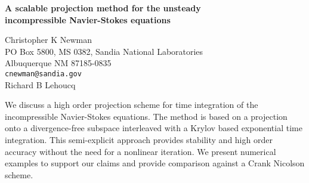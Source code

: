 \documentclass{report}
\begin{document}

\begin{center}
{\large
{\bf A scalable projection method for the unsteady \\
	incompressible Navier-Stokes equations}}

	Christopher K Newman \\
	PO Box 5800, MS 0382, Sandia National Laboratories \\
	Albuquerque NM 87185-0835 \\
	{\tt cnewman@sandia.gov} \\
	Richard B Lehoucq
\end{center}
We discuss a high order projection scheme for time
integration of the incompressible Navier-Stokes equations.
The method is based on a projection onto a divergence-free
subspace interleaved with a Krylov based exponential time
integration. This semi-explicit approach provides stability
and high order accuracy without the need for a nonlinear
iteration. We present numerical examples to support our
claims and provide comparison against a Crank Nicolson
scheme.



\end{document}
